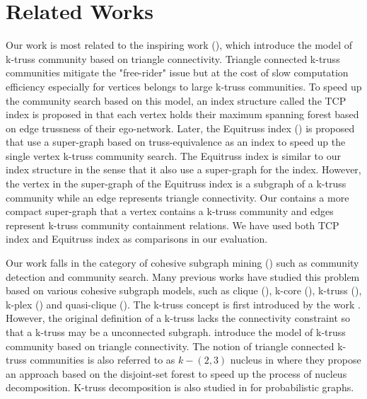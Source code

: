 \section{Related Works}
\label{relatedwork} 

Our work is most related to the inspiring work (\cite{huang2014querying}), which introduce the model of k-truss community based on triangle connectivity. Triangle connected k-truss communities mitigate the "free-rider" issue but at the cost of slow computation efficiency especially for vertices belongs to large k-truss communities. To speed up the community search based on this model, an index structure called the TCP index is proposed in \cite{huang2014querying} that each vertex holds their maximum spanning forest based on edge trussness of their ego-network. 
Later, the Equitruss index (\cite{akbas2017truss}) is proposed that use a super-graph based on truss-equivalence as an index to speed up the single vertex k-truss community search.  
The Equitruss index is similar to our index structure in the sense that it also use a super-graph for the index. However, the vertex in the super-graph of the Equitruss index is a subgraph of a k-truss community while an edge represents triangle connectivity. Our \twolevelindex{} contains a more compact super-graph that a vertex contains a k-truss community and edges represent k-truss community containment relations. We have used both TCP index and Equitruss index as comparisons in our evaluation.

Our work falls in the category of cohesive subgraph mining (\cite{koujaku2016dense,sozio2010community,cui2014local,li2015influential,mcauley2012learning}) such as community detection and community search. Many previous works have studied this problem based on various cohesive subgraph models, such as clique (\cite{bron1973algorithm,rossi2014fast}), k-core (\cite{shin2016corescope,barbieri2015efficient,li2017discovering}), k-truss (\cite{huang2014querying,wang2012truss,cohen2008trusses,huang2015approximate,huang2016truss,zheng2017finding}), k-plex (\cite{wangquery}) and quasi-clique (\cite{tsourakakis2013denser, lee2016query}). The k-truss concept is first introduced by the work \cite{cohen2008trusses}. However, the original definition of a k-truss lacks the connectivity constraint so that a k-truss may be a unconnected subgraph. \cite{huang2014querying} introduce the model of k-truss community based on triangle connectivity. The notion of triangle connected k-truss communities is also referred to as $k-(2,3)$ nucleus in \cite{sariyuce2016fast, sariyuce2017nucleus} where they propose an approach based on the disjoint-set forest to speed up the process of nucleus decomposition. K-truss decomposition is also studied in \cite{huang2016truss, zou2017truss} for probabilistic graphs. 

